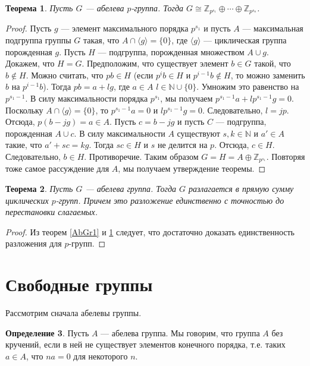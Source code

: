 \documentclass[12pt, titlepage, oneside]{amsbook}
\newcommand{\NN}{\mathbb{N}}
\newcommand{\ZZ}{\mathbb{Z}}
\newtheorem{theorem}{Теорема}[chapter]
\theoremstyle{definition}
\newtheorem{definition}[theorem]{Определение}
\theoremstyle{remark}
\begin{document}
\begin{theorem}
	\label{AbGr2} Пусть $G$ --- абелева $p$-группа. Тогда
	$G\cong\ZZ_{p^{s_{1}}}\oplus\cdots\oplus\ZZ_{p^{s_{n}}}$.
\end{theorem}

\begin{proof}
	Пусть $g$ --- элемент максимального порядка $p^{s_{1}}$ и пусть $A$
	--- максимальная подгруппа группы $G$ такая, что $A\cap\langle
		g\rangle=\{0\}$, где $\langle g\rangle$ --- циклическая группа
	порожденная $g$. Пусть $H$ --- подгруппа, порожденная множеством
	$A\cup g$. Докажем, что $H=G$. Предположим, что существует элемент
	$b\in G$ такой, что $b\not\in H$. Можно считать, что $pb\in H$ (если
	$p^ib\in H$ и $p^{i-1}b\not\in H$, то можно заменить $b$ на
	$p^{i-1}b$). Тогда $pb=a+lg$, где $a\in A$ $l\in\NN\cup\{0\}$.
	Умножим это равенство на $p^{s_{1}-1}$. В силу максимальности
	порядка $p^{s_{1}}$, мы получаем $p^{s_{1}-1}a+lp^{s_{1}-1}g=0$.
	Поскольку $A\cap\langle g\rangle=\{0\}$, то $p^{s_{1}-1}a=0$ и
	$lp^{s_{1}-1}g=0$. Следовательно, $l=jp$. Отсюда, $p(b-jg)=a\in A$.
	Пусть $c=b-jg$ и пусть $C$ --- подгруппа, порожденная $A\cup c$. В
	силу максимальности $A$ существуют $s,k\in\NN$ и $a'\in A$ такие,
	что $a'+sc=kg$. Тогда $sc\in H$ и $s$ не делится на $p$. Отсюда,
	$c\in H$. Следовательно, $b\in H$. Противоречие. Таким образом
	$G=H=A\oplus\ZZ_{p^{s_{1}}}$. Повторяя тоже самое рассуждение для
	$A$, мы получаем утверждение теоремы.
\end{proof}

\begin{theorem}
	\label{AbGr3} Пусть $G$ --- абелева группа. Тогда $G$ разлагается в
	прямую сумму циклических $p$-групп. Причем это разложение
	единственно с точностью до перестановки слагаемых.
\end{theorem}

\begin{proof}
	Из теорем \ref{AbGr1} и \ref{AbGr2} следует, что достаточно доказать
	единственность разложения для $p$-групп.
\end{proof}

\section{Свободные группы}

Рассмотрим сначала абелевы группы.

\begin{definition}
	Пусть $A$ --- абелева группа. Мы говорим, что группа $A$ без кручений, если в ней не существует элементов конечного порядка, т.е. таких $a\in A$, что $na=0$ для некоторого $n$.
\end{definition}
\end{document}
